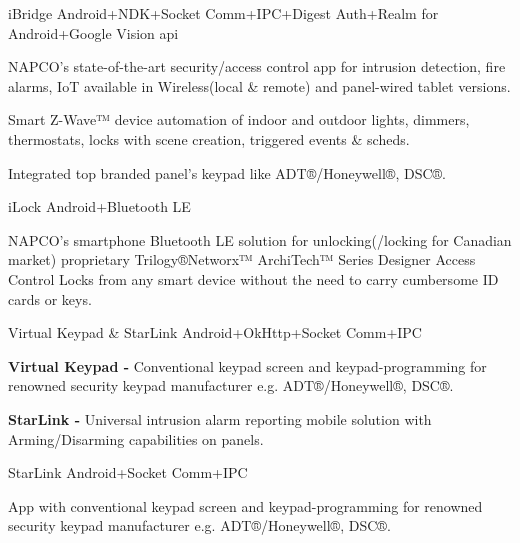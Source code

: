 

\begin{projectentries}

  \projectentry 
    {iBridge} 
    {Android+NDK+Socket Comm+IPC+Digest Auth+Realm for Android+Google Vision api }
    {
      \begin{projectitems} %
        \item {NAPCO's state-of-the-art security/access control app for intrusion detection, fire alarms, IoT 
        available in Wireless(local \& remote) and panel-wired tablet versions.}
        \item {Smart Z-Wave™ device automation of indoor and outdoor lights, dimmers, thermostats, locks with scene creation, triggered events \& scheds.}
        \item {Integrated top branded panel's keypad like ADT®/Honeywell®, DSC®.}
      \end{projectitems}
    }
    
    \projectentry 
    {iLock} 
    {Android+Bluetooth LE}
    {
      \begin{projectitems} %
        \item {NAPCO's smartphone Bluetooth LE solution for unlocking(/locking for Canadian market) proprietary Trilogy®Networx™ ArchiTech™ 
        Series Designer Access Control Locks from any smart device without the need to carry cumbersome ID cards or keys.}
      \end{projectitems}
    }

    \projectentry 
    {Virtual Keypad \& StarLink} 
    {Android+OkHttp+Socket Comm+IPC}
    {
      \begin{projectitems} %
        \item {\textbf{Virtual Keypad - }Conventional keypad screen and keypad-programming for renowned security keypad manufacturer e.g. ADT®/Honeywell®, DSC®.}
        \item {\textbf{StarLink - }Universal intrusion alarm reporting mobile solution with Arming/Disarming capabilities on panels.}
      \end{projectitems}
    }

    \projectentry 
    {StarLink} 
    {Android+Socket Comm+IPC}
    {
      \begin{projectitems} %
        \item {App with conventional keypad screen and keypad-programming for renowned security keypad manufacturer e.g. ADT®/Honeywell®, DSC®.}
      \end{projectitems}
    }

\end{projectentries}
